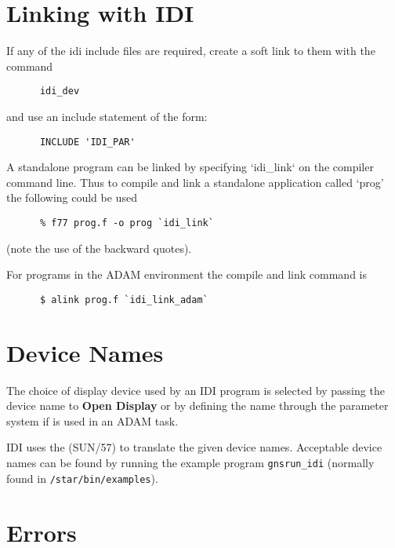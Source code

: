 \section{Linking with IDI}
If any of the idi include files are required, create a soft link to them
with the command
\begin{small}
\begin{verbatim}
      idi_dev
\end{verbatim}
\end{small}
and use an include statement of the form:
\begin{small}
\begin{verbatim}
      INCLUDE 'IDI_PAR'
\end{verbatim}
\end{small}

A standalone program can be linked by specifying `idi\_link` on the
compiler command line. Thus to compile and link a standalone application
called `prog' the following could be used
\begin{small}
\begin{verbatim}
      % f77 prog.f -o prog `idi_link`
\end{verbatim}
\end{small}
(note the use of the backward quotes).

For programs in the ADAM environment the compile and link command is
\begin{small}
\begin{verbatim}
      $ alink prog.f `idi_link_adam`
\end{verbatim}
\end{small}

\section{Device Names}

The choice of display device used by an IDI program is selected by
passing the device name to {\bf Open Display} or by defining the name
through the parameter system if 
 is used in an ADAM task.

IDI uses the 
(SUN/57) to translate the given
device names. Acceptable device names can be found by running the example
program {\tt gnsrun\_idi} (normally found in {\tt /star/bin/examples}).


\section{Errors}

